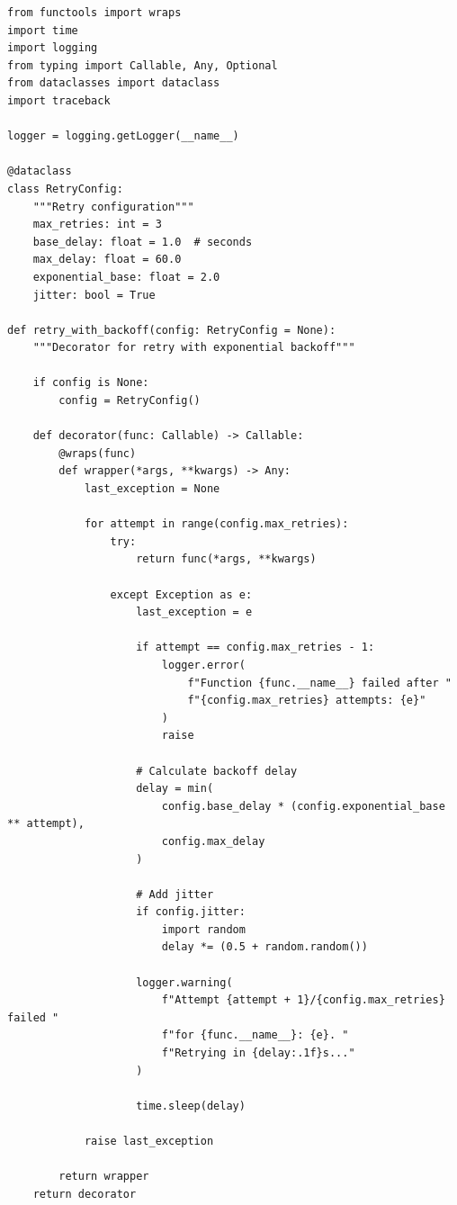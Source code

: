 \begin{lstlisting}[style=python, caption=Production-Grade Failure Handling]
from functools import wraps
import time
import logging
from typing import Callable, Any, Optional
from dataclasses import dataclass
import traceback

logger = logging.getLogger(__name__)

@dataclass
class RetryConfig:
    """Retry configuration"""
    max_retries: int = 3
    base_delay: float = 1.0  # seconds
    max_delay: float = 60.0
    exponential_base: float = 2.0
    jitter: bool = True

def retry_with_backoff(config: RetryConfig = None):
    """Decorator for retry with exponential backoff"""

    if config is None:
        config = RetryConfig()

    def decorator(func: Callable) -> Callable:
        @wraps(func)
        def wrapper(*args, **kwargs) -> Any:
            last_exception = None

            for attempt in range(config.max_retries):
                try:
                    return func(*args, **kwargs)

                except Exception as e:
                    last_exception = e

                    if attempt == config.max_retries - 1:
                        logger.error(
                            f"Function {func.__name__} failed after "
                            f"{config.max_retries} attempts: {e}"
                        )
                        raise

                    # Calculate backoff delay
                    delay = min(
                        config.base_delay * (config.exponential_base ** attempt),
                        config.max_delay
                    )

                    # Add jitter
                    if config.jitter:
                        import random
                        delay *= (0.5 + random.random())

                    logger.warning(
                        f"Attempt {attempt + 1}/{config.max_retries} failed "
                        f"for {func.__name__}: {e}. "
                        f"Retrying in {delay:.1f}s..."
                    )

                    time.sleep(delay)

            raise last_exception

        return wrapper
    return decorator


\end{lstlisting}
